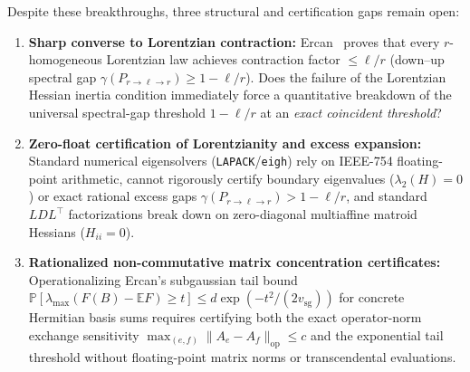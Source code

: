 \documentclass[11pt,a4paper]{article}
\theoremstyle{definition}
\theoremstyle{remark}
\begin{document}
Despite these breakthroughs, three structural and certification gaps remain open:
\begin{enumerate}[leftmargin=1.8em,itemsep=2pt]
  \item \textbf{Sharp converse to Lorentzian contraction:} Ercan~\cite{ercan2026lorentzian} proves that every $r$-homogeneous Lorentzian law achieves contraction factor $\le \ell/r$ (down--up spectral gap $\gamma(P_{r\to\ell\to r}) \ge 1 - \ell/r$). Does the failure of the Lorentzian Hessian inertia condition immediately force a quantitative breakdown of the universal spectral-gap threshold $1-\ell/r$ at an \emph{exact coincident threshold}?
  \item \textbf{Zero-float certification of Lorentzianity and excess expansion:} Standard numerical eigensolvers (\texttt{LAPACK}/\texttt{eigh}) rely on IEEE-754 floating-point arithmetic, cannot rigorously certify boundary eigenvalues ($\lambda_2(H) = 0$) or exact rational excess gaps $\gamma(P_{r\to\ell\to r}) > 1-\ell/r$, and standard $LDL^\top$ factorizations break down on zero-diagonal multiaffine matroid Hessians ($H_{ii} = 0$).
  \item \textbf{Rationalized non-commutative matrix concentration certificates:} Operationalizing Ercan's subgaussian tail bound $\mathbb{P}[\lambda_{\max}(F(B)-\mathbb{E}F) \ge t] \le d\exp(-t^2/(2v_{\mathrm{sg}}))$ for concrete Hermitian basis sums requires certifying both the exact operator-norm exchange sensitivity $\max_{(e,f)}\|A_e - A_f\|_{\mathrm{op}} \le c$ and the exponential tail threshold without floating-point matrix norms or transcendental evaluations.
\end{enumerate}
\end{document}
